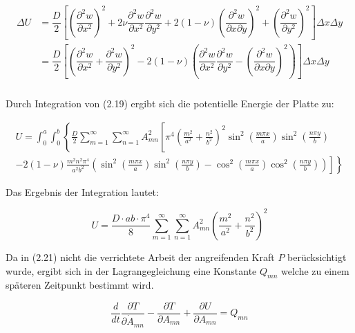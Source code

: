 \begin{align}
\begin{split}
\Delta U 	&=  \dfrac{D}{2}\left[
\left(\dfrac{\partial^2 w}{\partial x^2}\right)^2
+ 2 \nu \dfrac{\partial^2 w}{\partial x^2} \dfrac{\partial^2 w}{\partial y^2}
+ 2(1-\nu) \left(\dfrac{\partial^2 w}{\partial x \partial y}\right)^2
+ \left(\dfrac{\partial^2 w}{\partial y^2}\right)^2 \right] \Delta x \Delta y\\
&=  \dfrac{D}{2}\left[
\left(
\dfrac{\partial^2 w}{\partial x^2} + \dfrac{\partial^2 w}{\partial y^2}\right)^2 
- 2 (1-\nu) \left( \dfrac{\partial^2 w}{\partial x^2} \dfrac{\partial^2 w}{\partial y^2} - \left( \dfrac{\partial^2 w}{\partial x \partial y} \right)^2\right) \right] \Delta x \Delta y\\
\end{split}
\end{align}


Durch Integration von (2.19) ergibt sich die potentielle Energie der Platte zu:


\begin{multline}
U = \int_0^a \int_0^b \left\{
\frac{D}{2} \sum_{m = 1}^{\infty}\sum_{n = 1}^{\infty} A^2_{mn}
\left[
\pi^4 \left(\frac{m^2}{a^2} + \frac{n^2}{b^2}\right)^2
\sin^2\left(\frac{m\pi x}{a}\right) \sin^2\left(\frac{n\pi y}{b}\right)
\right.
\right. \\
\left.
\left.
-2(1-\nu) 
\frac{m^2n^2\pi^4}{a^2b^2}
\left(
\sin^2\left(\frac{m\pi x}{a}\right) 
\sin^2\left(\frac{n\pi y}{b}\right)
- 
\cos^2\left(\frac{m\pi x}{a}\right) 
\cos^2\left(\frac{n\pi y}{b}\right)
\right)
\right] 
\right\}
\end{multline}

Das Ergebnis der Integration lautet:

\begin{equation}
U = \dfrac{D \cdot a b \cdot \pi^4}{8} \sum_{m=1}^{\infty}  \sum_{n=1}^{\infty} A^2_{mn}  \left( \dfrac{m^2}{a^2} + \dfrac{n^2}{b^2}\right)^2
\end{equation}


Da in (2.21) nicht die verrichtete Arbeit der angreifenden Kraft $P$ berücksichtigt wurde, ergibt sich in der Lagrangegleichung eine Konstante $Q_{mn}$ welche zu einem späteren Zeitpunkt bestimmt wird.

\begin{equation}
\dfrac{d}{dt} \dfrac{\partial T}{\partial \dot{A}_{mn}} - \dfrac{\partial T}{\partial A_{mn}} + \dfrac{\partial U}{\partial A_{mn}} = Q_{mn}
\end{equation}

